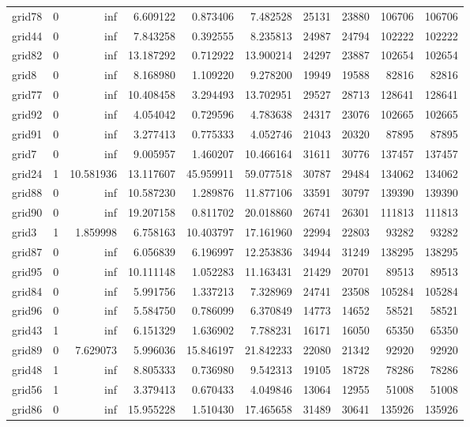 \begin{longtable}{|l|r|r|r|r|r|r|r|r|r|}
grid78 & 0 & inf & 6.609122 & 0.873406 & 7.482528 & 25131 & 23880 & 106706 & 106706 \\
grid44 & 0 & inf & 7.843258 & 0.392555 & 8.235813 & 24987 & 24794 & 102222 & 102222 \\
grid82 & 0 & inf & 13.187292 & 0.712922 & 13.900214 & 24297 & 23887 & 102654 & 102654 \\
grid8 & 0 & inf & 8.168980 & 1.109220 & 9.278200 & 19949 & 19588 & 82816 & 82816 \\
grid77 & 0 & inf & 10.408458 & 3.294493 & 13.702951 & 29527 & 28713 & 128641 & 128641 \\
grid92 & 0 & inf & 4.054042 & 0.729596 & 4.783638 & 24317 & 23076 & 102665 & 102665 \\
grid91 & 0 & inf & 3.277413 & 0.775333 & 4.052746 & 21043 & 20320 & 87895 & 87895 \\
grid7 & 0 & inf & 9.005957 & 1.460207 & 10.466164 & 31611 & 30776 & 137457 & 137457 \\
grid24 & 1 & 10.581936 & 13.117607 & 45.959911 & 59.077518 & 30787 & 29484 & 134062 & 134062 \\
grid88 & 0 & inf & 10.587230 & 1.289876 & 11.877106 & 33591 & 30797 & 139390 & 139390 \\
grid90 & 0 & inf & 19.207158 & 0.811702 & 20.018860 & 26741 & 26301 & 111813 & 111813 \\
grid3 & 1 & 1.859998 & 6.758163 & 10.403797 & 17.161960 & 22994 & 22803 & 93282 & 93282 \\
grid87 & 0 & inf & 6.056839 & 6.196997 & 12.253836 & 34944 & 31249 & 138295 & 138295 \\
grid95 & 0 & inf & 10.111148 & 1.052283 & 11.163431 & 21429 & 20701 & 89513 & 89513 \\
grid84 & 0 & inf & 5.991756 & 1.337213 & 7.328969 & 24741 & 23508 & 105284 & 105284 \\
grid96 & 0 & inf & 5.584750 & 0.786099 & 6.370849 & 14773 & 14652 & 58521 & 58521 \\
grid43 & 1 & inf & 6.151329 & 1.636902 & 7.788231 & 16171 & 16050 & 65350 & 65350 \\
grid89 & 0 & 7.629073 & 5.996036 & 15.846197 & 21.842233 & 22080 & 21342 & 92920 & 92920 \\
grid48 & 1 & inf & 8.805333 & 0.736980 & 9.542313 & 19105 & 18728 & 78286 & 78286 \\
grid56 & 1 & inf & 3.379413 & 0.670433 & 4.049846 & 13064 & 12955 & 51008 & 51008 \\
grid86 & 0 & inf & 15.955228 & 1.510430 & 17.465658 & 31489 & 30641 & 135926 & 135926 \\

\end{longtable}
